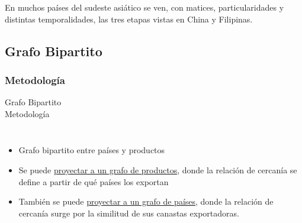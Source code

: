 \documentclass[compress]{beamer}
\begin{document}
\begin{frame}
\begin{columns}[c]
\end{columns} 

En muchos países del sudeste asiático se ven, con matices, particularidades y distintas temporalidades, las tres etapas vistas en China y Filipinas. 

\end{frame}


\subsection{Grafo Bipartito}
\subsubsection{Metodología}

\begin{frame}
\centering
\Large Grafo Bipartito \\

\normalsize Metodología
\end{frame}

\begin{frame}


\begin{columns}[c] 

\centering
{} 

\small

\begin{itemize}[label=\faRebel]
\item Grafo bipartito entre países y productos
\item Se puede \underline{proyectar a un grafo de productos}, donde la relación de cercanía se define a partir de qué países los exportan
\item También se puede \underline{proyectar a un grafo de países}, donde la relación de cercanía surge por la similitud de sus canastas exportadoras.
\end{itemize}

\end{columns}

\end{frame}
\end{document}
